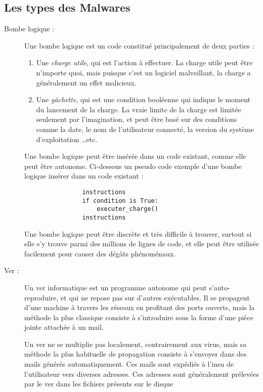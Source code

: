     \subsection{Les types des Malwares}

    \begin{description}
        \item[Bombe logique :] Une bombe logique est un code constitué principalement de deux parties :
            \begin{enumerate}
                \item Une \emph{charge utile}, qui est l'action à effectuer. La charge utile peut être n'importe quoi,
                    mais puisque c'est un logiciel malveillant, la charge a généralement un effet malicieux.
                \item Une \emph{gâchette}, qui est une condition booléenne qui indique le moment du lancement de la
                    charge. La vraie limite de la charge est limitée seulement par l'imagination, et peut être basé sur
                    des conditions comme la date, le nom de l'utilisateur connecté, la version du système d'exploitation
                    \ldots etc.
            \end{enumerate}
            Une bombe logique peut être insérée dans un code existant, comme elle peut être autonome. 
            Ci-dessous un pseudo code exemple d'une bombe logique insérer dans un code existant :
            \begin{verbatim}
                instructions
                if condition is True:
                    executer_charge()
                instructions
            \end{verbatim}
            Une bombe logique peut être discrète et très difficile à trouver, surtout si elle s'y trouve parmi des 
            millions de lignes de code, et elle peut être utilisée facilement pour causer des 
            dégâts phénoménaux. \cite{virus} %

        \item[Ver :] Un ver informatique est un programme autonome qui peut s'auto-reproduire, 
            et qui ne repose pas sur d’autres exécutables. Il se propagent d'une machine à travers les 
            réseaux en profitant des ports ouverts, mais la méthode la plus classique consiste à s'introduire 
            sous la forme d'une pièce jointe attachée à un mail.%

            Un ver ne se multiplie pas localement, contrairement aux virus, mais sa méthode la plus 
            habituelle de propagation consiste à s'envoyer dans des mails générés automatiquement. 
            Ces mails sont expédiés à l'insu de l'utilisateur vers diverses adresses. 
            Ces adresses sont généralement prélevées par le ver dans les fichiers présents sur le disque%


\end{description}

